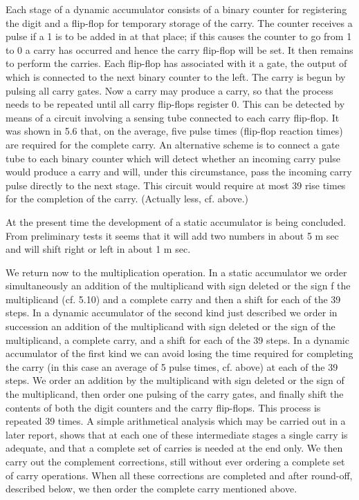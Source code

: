 \documentclass[12pt]{amsart}
\begin{document}
Each stage of a dynamic accumulator consists of a binary counter for registering the digit and a flip-flop for temporary storage of the carry. The counter receives a pulse if a 1 is to be added in at that place; if this causes the counter to go from 1 to 0 a carry has occurred and hence the carry flip-flop will be set. It then remains to perform the carries. Each flip-flop has associated with it a gate, the output of which is connected to the next binary counter to the left. The carry is begun by pulsing all carry gates. Now a carry may produce a carry, so that the process needs to be repeated until all carry flip-flops register 0. This can be detected by means of a circuit involving a sensing tube connected to each carry flip-flop. It was shown in 5.6 that, on the average, five pulse times (flip-flop reaction times) are required for the complete carry. An alternative scheme is to connect a gate tube to each binary counter which will detect whether an incoming carry pulse would produce a carry and will, under this circumstance, pass the incoming carry pulse directly to the next stage. This circuit would require at most 39 rise times for the completion of the carry. (Actually less, cf. above.)

At the present time the development of a static accumulator is being concluded. From preliminary tests it seems that it will add two numbers in about 5 m sec and will shift right or left in about 1 m sec.

We return now to the multiplication operation. In a static accumulator we order simultaneously an addition of the multiplicand with sign deleted or the sign f the multiplicand (cf. 5.10) and a complete carry and then a shift for each of the 39 steps. In a dynamic accumulator of the second kind just described we order in succession an addition of the multiplicand with sign deleted or the sign of the multiplicand, a complete carry, and a shift for each of the 39 steps. In a dynamic accumulator of the first kind we can avoid losing the time required for completing the carry (in this case an average of 5 pulse times, cf. above) at each of the 39 steps. We order an addition by the multiplicand with sign deleted or the sign of the multiplicand, then order one pulsing of the carry gates, and finally shift the contents of both the digit counters and the carry flip-flops. This process is repeated 39 times. A simple arithmetical analysis which may be carried out in a later report, shows that at each one of these intermediate stages a single carry is adequate, and that a complete set of carries is needed at the end only. We then carry out the complement corrections, still without ever ordering a complete set of carry operations. When all these corrections are completed and after round-off, described below, we then order the complete carry mentioned above.
\end{document}

